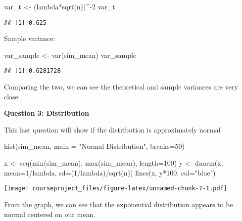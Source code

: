 \documentclass[
]{article}
\newenvironment{Shaded}{\begin{snugshade}}{\end{snugshade}}
\newcommand{\AttributeTok}[1]{\textcolor[rgb]{0.77,0.63,0.00}{#1}}
\newcommand{\DecValTok}[1]{\textcolor[rgb]{0.00,0.00,0.81}{#1}}
\newcommand{\FunctionTok}[1]{\textcolor[rgb]{0.00,0.00,0.00}{#1}}
\newcommand{\NormalTok}[1]{#1}
\newcommand{\OtherTok}[1]{\textcolor[rgb]{0.56,0.35,0.01}{#1}}
\newcommand{\SpecialCharTok}[1]{\textcolor[rgb]{0.00,0.00,0.00}{#1}}
\newcommand{\StringTok}[1]{\textcolor[rgb]{0.31,0.60,0.02}{#1}}
\begin{document}
\begin{Shaded}
\begin{Highlighting}[]
\NormalTok{var\_t }\OtherTok{\textless{}{-}}\NormalTok{ (lambda}\SpecialCharTok{*}\FunctionTok{sqrt}\NormalTok{(n))}\SpecialCharTok{\^{}{-}}\DecValTok{2}
\NormalTok{var\_t}
\end{Highlighting}
\end{Shaded}

\begin{verbatim}
## [1] 0.625
\end{verbatim}

Sample variance:

\begin{Shaded}
\begin{Highlighting}[]
\NormalTok{var\_sample }\OtherTok{\textless{}{-}} \FunctionTok{var}\NormalTok{(sim\_mean)}
\NormalTok{var\_sample}
\end{Highlighting}
\end{Shaded}

\begin{verbatim}
## [1] 0.6281728
\end{verbatim}

Comparing the two, we can see the theoretical and sample variances are
very close

\textbf{Question 3: Distribution}

This last question will show if the distribution is approximately normal

\begin{Shaded}
\begin{Highlighting}[]
\FunctionTok{hist}\NormalTok{(sim\_mean, }\AttributeTok{main =} \StringTok{"Normal Distribution"}\NormalTok{, }\AttributeTok{breaks=}\DecValTok{50}\NormalTok{)}

\NormalTok{x }\OtherTok{\textless{}{-}} \FunctionTok{seq}\NormalTok{(}\FunctionTok{min}\NormalTok{(sim\_mean), }\FunctionTok{max}\NormalTok{(sim\_mean), }\AttributeTok{length=}\DecValTok{100}\NormalTok{)}
\NormalTok{y }\OtherTok{\textless{}{-}} \FunctionTok{dnorm}\NormalTok{(x, }\AttributeTok{mean=}\DecValTok{1}\SpecialCharTok{/}\NormalTok{lambda, }\AttributeTok{sd=}\NormalTok{(}\DecValTok{1}\SpecialCharTok{/}\NormalTok{lambda)}\SpecialCharTok{/}\FunctionTok{sqrt}\NormalTok{(n))}
\FunctionTok{lines}\NormalTok{(x, y}\SpecialCharTok{*}\DecValTok{100}\NormalTok{, }\AttributeTok{col=}\StringTok{"blue"}\NormalTok{)}
\end{Highlighting}
\end{Shaded}

\texttt{[image: courseproject\_files/figure-latex/unnamed-chunk-7-1.pdf]}

From the graph, we can see that the exponential distribution appears to
be normal centered on our mean.
\end{document}
